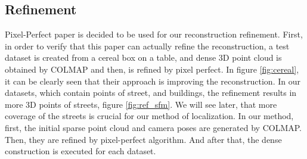 \documentclass[11pt]{article}
\begin{document}
    \subsection{Refinement}
    Pixel-Perfect paper \cite{lindenberger2021pixsfm} is decided to be used for our reconstruction refinement.
    First, in order to verify that this paper can actually refine the reconstruction, a test dataset is
    created from a cereal box on a table, and dense 3D point cloud is obtained by COLMAP
    and then, is refined by pixel perfect. In figure \ref{fig:cereal}, it can be clearly seen that their approach is improving the reconstruction.
    In our datasets, which contain points of street, and buildings, the refinement results in more 3D points of streets, figure \ref{fig:ref_sfm}.
    We will see later, that more coverage of the streets is crucial for our method of localization.
    In our method, first, the initial sparse point cloud and camera poses are generated by COLMAP. Then, they are refined
    by pixel-perfect algorithm. And after that, the dense construction is executed for each dataset.
\end{document}

